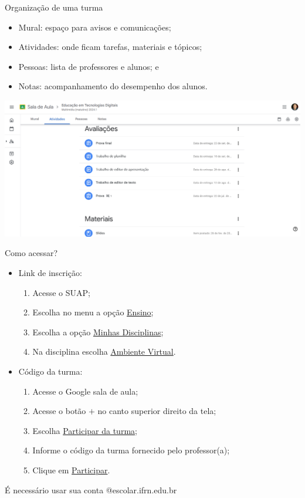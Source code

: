 \documentclass[aspectratio=169]{beamer} %
\begin{document}
\begin{frame}{Organização de uma turma}
	
	\begin{itemize}
		\item Mural: espaço para avisos e comunicações;
		\item Atividades: onde ficam tarefas, materiais e tópicos;
		\item Pessoas: lista de professores e alunos; e
		\item Notas: acompanhamento do desempenho dos alunos.
	\end{itemize}\vfill
	
	\begin{center}
		\includegraphics[scale=0.2]{img/turma}
	\end{center}
\end{frame}

\begin{frame}{Como acessar?}
	
	\begin{itemize}
		\item Link de inscrição:
		\begin{enumerate}
			\item Acesse o SUAP;
			\item Escolha no menu a opção \underline{Ensino};
			\item Escolha a opção \underline{Minhas Disciplinas};
			\item Na disciplina escolha \underline{Ambiente Virtual}.
		\end{enumerate}
		\item Código da turma:
		\begin{enumerate}
			\item Acesse o Google sala de aula;
			\item Acesse o botão $+$ no canto superior direito da tela;
			\item Escolha \underline{Participar da turma};
			\item Informe o código da turma fornecido pelo professor(a);
			\item Clique em \underline{Participar}.
		\end{enumerate}
	\end{itemize} \vfill
	
	\alert{É necessário usar sua conta @escolar.ifrn.edu.br}
\end{frame}
\end{document}
